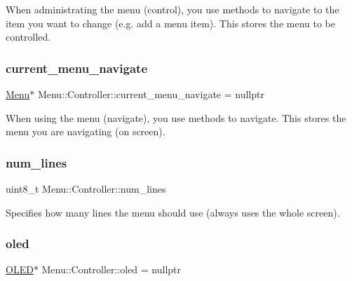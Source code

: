 When administrating the menu (control), you use methods to navigate to the item you want to change (e.\+g. add a menu item). This stores the menu to be controlled. \hypertarget{class_menu_1_1_controller_a66ffabf19a4423ccca536762f0b9df88}{}\label{class_menu_1_1_controller_a66ffabf19a4423ccca536762f0b9df88} 
\subsubsection{\texorpdfstring{current\+\_\+menu\+\_\+navigate}{current\_menu\_navigate}}
{\footnotesize\ttfamily \hyperlink{struct_menu_1_1_menu}{Menu}$\ast$ Menu\+::\+Controller\+::current\+\_\+menu\+\_\+navigate = nullptr\hspace{0.3cm}{\ttfamily [private]}}

When using the menu (navigate), you use methods to navigate. This stores the menu you are navigating (on screen). \hypertarget{class_menu_1_1_controller_a80d614a66d1ffa2612688776842f1f31}{}\label{class_menu_1_1_controller_a80d614a66d1ffa2612688776842f1f31} 
\subsubsection{\texorpdfstring{num\+\_\+lines}{num\_lines}}
{\footnotesize\ttfamily uint8\+\_\+t Menu\+::\+Controller\+::num\+\_\+lines\hspace{0.3cm}{\ttfamily [private]}}

Specifies how many lines the menu should use (always uses the whole screen). \hypertarget{class_menu_1_1_controller_aaa0388123d9e3bb0d4f546336e2b502d}{}\label{class_menu_1_1_controller_aaa0388123d9e3bb0d4f546336e2b502d} 
\subsubsection{\texorpdfstring{oled}{oled}}
{\footnotesize\ttfamily \hyperlink{class_o_l_e_d}{O\+L\+ED}$\ast$ Menu\+::\+Controller\+::oled = nullptr\hspace{0.3cm}{\ttfamily [private]}}

